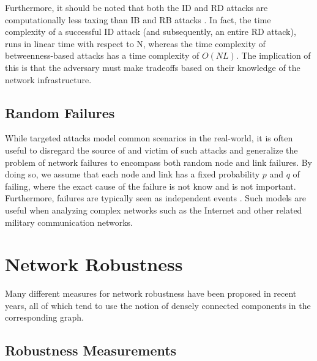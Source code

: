 \documentclass[doc]{apa}%
\begin{document}
Furthermore, it should be noted that both the ID and RD attacks are computationally less taxing than IB and RB attacks \cite{Attacks}. In fact, the time complexity of a successful ID attack (and subsequently, an entire RD attack), runs in linear time with respect to N, whereas the time complexity of betweenness-based attacks has a time complexity of $O(NL)$. The implication of this is that the adversary must make tradeoffs based on their knowledge of the network infrastructure.

\subsection{Random Failures}
\label{RandomFailures}
While targeted attacks model common scenarios in the real-world, it is often useful to disregard the source of and victim of such attacks and generalize the problem of network failures to encompass both random node and link failures. By doing so, we assume that each node and link has a fixed probability $p$ and $q$ of failing, where the exact cause of the failure is not know and is not important. Furthermore, failures are typically seen as independent events \cite{RandomStudy}. Such models are useful when analyzing complex networks such as the Internet and other related military communication networks. 

\section{Network Robustness}

Many different measures for network robustness have been proposed in recent years, all of which tend
to use the notion of densely connected components in the corresponding graph. 


\subsection{Robustness Measurements}
\end{document}

